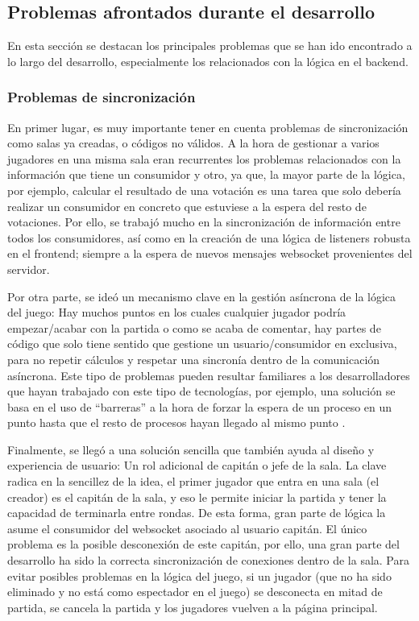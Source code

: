\subsection{Problemas afrontados durante el desarrollo}

En esta sección se destacan los principales problemas que se han ido encontrado a lo largo del desarrollo, especialmente los relacionados con 
la lógica en el backend.

\subsubsection{Problemas de sincronización}
En primer lugar, es muy importante tener en cuenta problemas de sincronización como salas ya creadas, o códigos no válidos. A la hora de gestionar a varios jugadores en una misma sala
eran recurrentes los problemas relacionados con la información que tiene un consumidor y otro, ya que, la mayor parte de la lógica, por ejemplo, calcular el resultado de una votación
es una tarea que solo debería realizar un consumidor en concreto que estuviese a la espera del resto de votaciones. Por ello, se trabajó mucho en la sincronización de información
entre todos los consumidores, así como en la creación de una lógica de listeners robusta en el frontend; siempre a la espera de nuevos mensajes websocket provenientes del servidor.

Por otra parte, se ideó un mecanismo clave en la gestión asíncrona de la lógica del juego: Hay muchos puntos en los cuales cualquier jugador podría empezar/acabar con la partida
o como se acaba de comentar, hay partes de código que solo tiene sentido que gestione un usuario/consumidor en exclusiva, para no repetir cálculos y respetar una sincronía dentro
de la comunicación asíncrona. Este tipo de problemas pueden resultar familiares a los desarrolladores que hayan trabajado con este tipo de tecnologías, por ejemplo, una solución
se basa en el uso de ``barreras'' a la hora de forzar la espera de un proceso en un punto hasta que el resto de procesos hayan llegado al mismo punto \cite{Barrier}. 

Finalmente, se llegó a una solución sencilla que también ayuda al diseño y experiencia de usuario: Un rol adicional de capitán o jefe de la sala. La clave radica en la sencillez de la idea, 
el primer jugador que entra en una sala (el creador) es el capitán de la sala, y eso le permite iniciar la partida y tener la capacidad de terminarla entre rondas. De esta forma, gran parte de lógica la asume el 
consumidor del websocket asociado al usuario capitán. El único problema es la posible desconexión de este capitán, por ello, una gran parte del desarrollo ha sido la correcta sincronización de conexiones dentro 
de la sala. Para evitar posibles problemas en la lógica del juego, si un jugador (que no ha sido eliminado y no está como espectador en el juego) se desconecta en mitad de partida, se cancela la partida 
y los jugadores vuelven a la página principal.

